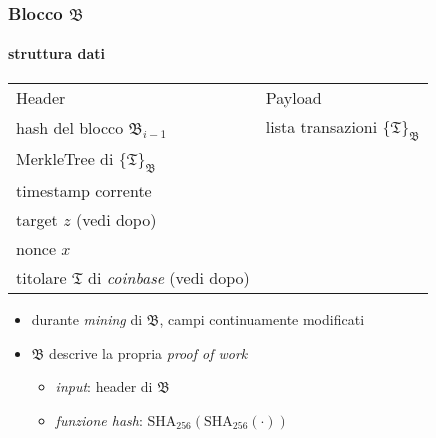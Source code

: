 \begin{frame}
	\frametitle{Blocco $\mathfrak{B}$}
	\framesubtitle{struttura dati} 
	
	\begin{table}
	  \centering
	  \begin{tabular}{ll}
	   	{\color{blue}Header} & {\color{blue}Payload} \\
			\tabitem hash del blocco $\mathfrak{B}_{i-1}$ & \tabitem lista transazioni $\{\mathfrak{T}\}_\mathfrak{B}$ \\
			\tabitem MerkleTree di $\{\mathfrak{T}\}_\mathfrak{B}$ \\
			\tabitem timestamp corrente \\
			\tabitem target $z$ (vedi dopo)\\
			\tabitem nonce $x$ \\
			\tabitem titolare $\mathfrak{T}$ di \textit{coinbase} (vedi dopo)
	  \end{tabular}
	\end{table}
	
	\begin{itemize}
		\item durante \textit{mining} di $\mathfrak{B}$, campi continuamente modificati
		\item $\mathfrak{B}$ descrive la propria \textit{proof of work}
		\begin{itemize}
			\item \textit{input}: header di $\mathfrak{B}$ 
			\item \textit{funzione hash}: $\text{SHA}_{256}(\text{SHA}_{256}(\cdot))$
		\end{itemize} 
	\end{itemize}

\end{frame}